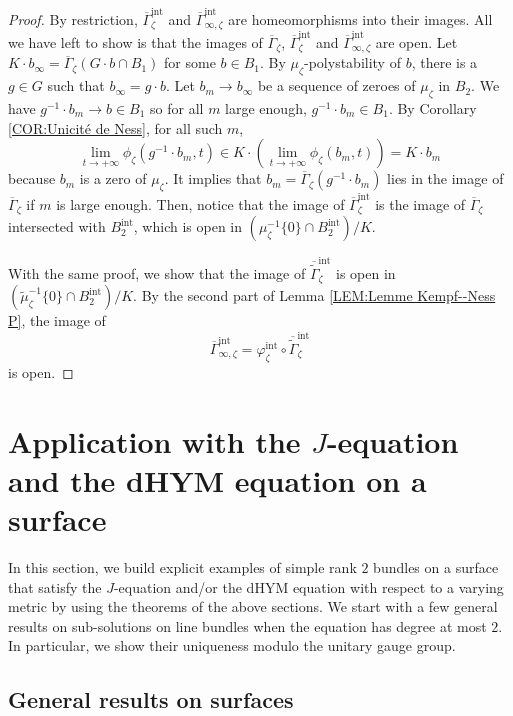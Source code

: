 \documentclass{article}
\theoremstyle{remark}
\theoremstyle{definition}
\begin{document}
\begin{proof}
By restriction, $\overline{\Gamma}_\zeta^{\mathrm{int}}$ and $\overline{\Gamma}_{\infty,\zeta}^{\mathrm{int}}$ are homeomorphisms into their images. All we have left to show is that the images of $\overline{\Gamma}_\zeta$, $\overline{\Gamma}_\zeta^{\mathrm{int}}$ and $\overline{\Gamma}_{\infty,\zeta}^{\mathrm{int}}$ are open. Let $K \cdot b_\infty = \overline{\Gamma}_\zeta(G \cdot b \cap B_1)$ for some $b \in B_1$. By $\mu_\zeta$-polystability of $b$, there is a $g \in G$ such that $b_\infty = g \cdot b$. Let $b_m \rightarrow b_\infty$ be a sequence of zeroes of $\mu_\zeta$ in $B_2$. We have $g^{-1} \cdot b_m \rightarrow b \in B_1$ so for all $m$ large enough, $g^{-1} \cdot b_m \in B_1$. By Corollary \ref{COR:Unicité de Ness}, for all such $m$,
$$
\lim_{t \rightarrow +\infty} \phi_\zeta(g^{-1} \cdot b_m,t) \in K \cdot \left(\lim_{t \rightarrow +\infty} \phi_\zeta(b_m,t)\right) = K \cdot b_m
$$
because $b_m$ is a zero of $\mu_\zeta$. It implies that $b_m = \overline{\Gamma}_\zeta(g^{-1} \cdot b_m)$ lies in the image of $\overline{\Gamma}_\zeta$ if $m$ is large enough. Then, notice that the image of  $\overline{\Gamma}_\zeta^{\mathrm{int}}$ is the image of $\overline{\Gamma}_\zeta$ intersected with $B_2^{\mathrm{int}}$, which is open in $(\mu_\zeta^{-1}\{0\} \cap B_2^{\mathrm{int}})/K$.

With the same proof, we show that the image of $\overline{\tilde{\Gamma}}_\zeta^{\mathrm{int}}$ is open in $(\tilde{\mu}_\zeta^{-1}\{0\} \cap B_2^{\mathrm{int}})/K$. By the second part of Lemma \ref{LEM:Lemme Kempf--Ness P}, the image of
$$
\overline{\Gamma}_{\infty,\zeta}^{\mathrm{int}} = \varphi_\zeta^{\mathrm{int}} \circ \overline{\tilde{\Gamma}}_\zeta^{\mathrm{int}}
$$
is open.
\end{proof}

\section{Application with the $J$-equation and the dHYM equation on a surface}\label{SEC:Exemple avec la J-équation}

In this section, we build explicit examples of simple rank $2$ bundles on a surface that satisfy the $J$-equation and/or the dHYM equation with respect to a varying metric by using the theorems of the above sections. We start with a few general results on sub-solutions on line bundles when the equation has degree at most $2$. In particular, we show their uniqueness modulo the unitary gauge group.

\subsection{General results on surfaces}
\end{document}
